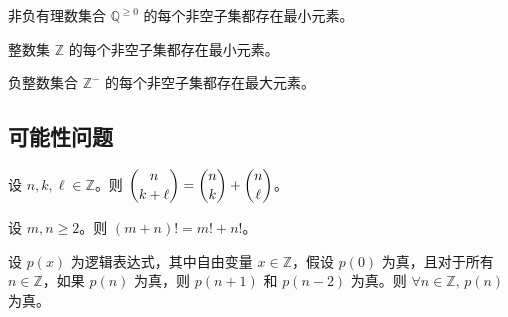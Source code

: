 \begin{chapex} %
非负有理数集合 $\mathbb{Q}^{\ge 0}$ 的每个非空子集都存在最小元素。 
\end{chapex}

\begin{chapex} %
整数集 $\mathbb{Z}$ 的每个非空子集都存在最小元素。
\end{chapex}

\begin{chapex} %
\label{cqInductionTFEnd}
负整数集合 $\mathbb{Z}^{-}$ 的每个非空子集都存在最大元素。
\end{chapex}

\subsection*{可能性问题}


\begin{chapex} %
\label{cqInductionASNBegin}
设 $n,k,\ell \in \mathbb{Z}$。则 $\dbinom{n}{k+\ell} = \dbinom{n}{k} + \dbinom{n}{\ell}$。
\end{chapex}

\begin{chapex} %
设 $m,n \ge 2$。则 $(m+n)! = m!+n!$。
\end{chapex}

\begin{chapex} %
\label{cqInductionASNEnd}
设 $p(x)$ 为逻辑表达式，其中自由变量 $x \in \mathbb{Z}$，假设 $p(0)$ 为真，且对于所有 $n \in \mathbb{Z}$，如果 $p(n)$ 为真，则 $p(n+1)$ 和 $p(n-2)$ 为真。则 $\forall n \in \mathbb{Z},\, p(n)$ 为真。
\end{chapex}